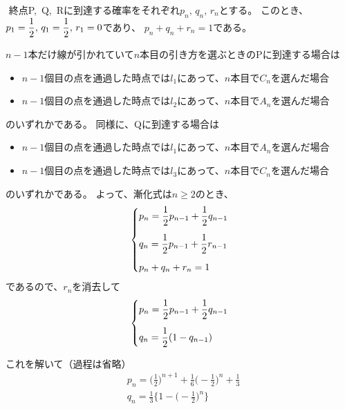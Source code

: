 \documentclass[a4paper]{ltjsarticle}
\begin{document}
\begin{ans*}
  ${}$
  終点P,~Q,~Rに到達する確率をそれぞれ$p_{n},\,q_{n},\,r_{n}$とする。
  このとき、$\displaystyle p_{1} = \frac{1}{2},\,q_{1} = \frac{1}{2},\,r_{1} = 0$であり、
  $p_{n} + q_{n} + r_{n} = 1$である。

  $n-1$本だけ線が引かれていて$n$本目の引き方を選ぶときのPに到達する場合は %
  \begin{itemize}
    \item $n-1$個目の点を通過した時点では$l_{1}$にあって、$n$本目で$C_{n}$を選んだ場合
    \item $n-1$個目の点を通過した時点では$l_{2}$にあって、$n$本目で$A_{n}$を選んだ場合
  \end{itemize}
  のいずれかである。
  同様に、Qに到達する場合は %
  \begin{itemize}
    \item $n-1$個目の点を通過した時点では$l_{1}$にあって、$n$本目で$A_{n}$を選んだ場合
    \item $n-1$個目の点を通過した時点では$l_{3}$にあって、$n$本目で$C_{n}$を選んだ場合
  \end{itemize}
  のいずれかである。
  よって、漸化式は$n\geq 2$のとき、
  \begin{gather*}
    \begin{dcases}
      p_{n} = \frac{1}{2}p_{n-1} + \frac{1}{2}q_{n-1} \\[.5em]
      q_{n} = \frac{1}{2}p_{n-1} + \frac{1}{2}r_{n-1} \\[.5em]
      p_{n} + q_{n} + r_{n} = 1
    \end{dcases}
  \end{gather*}
  であるので、$r_{n}$を消去して
  \begin{gather*}
    \begin{dcases}
      p_{n} = \frac{1}{2}p_{n-1} + \frac{1}{2}q_{n-1} \\[.5em]
      q_{n} = \frac{1}{2}(1-q_{n-1})
    \end{dcases}
  \end{gather*}

  これを解いて（過程は省略）
  \begin{align*}
    &p_{n} = \biggl(\frac{1}{2}\biggr)^{n+1} + \frac{1}{6}\biggl(-\frac{1}{2}\biggr)^{n} + \frac{1}{3} \\
    &q_{n} = \frac{1}{3}\biggl\{ 1 - \biggl( -\frac{1}{2} \biggr)^{n} \biggr\}
  \end{align*}
\end{ans*}
\end{document}
